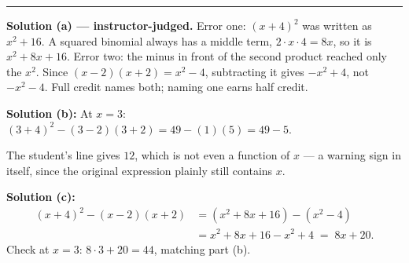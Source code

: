 \documentclass[12pt]{article}
\begin{document}
\vspace{0.15cm}\noindent\rule{\linewidth}{0.2pt}


\textbf{Solution (a) --- instructor-judged.} Error one: $(x + 4)^2$ was written as $x^2 + 16$. A
squared binomial always has a middle term, $2\cdot x\cdot 4 = 8x$, so it is $x^2 + 8x + 16$.
Error two: the minus in front of the second product reached only the $x^2$. Since
$(x-2)(x+2) = x^2 - 4$, subtracting it gives $-x^2 + 4$, not $-x^2 - 4$. Full credit names both;
naming one earns half credit.

\noindent\textbf{Solution (b):} \quad At $x = 3$:
$(3 + 4)^2 - (3 - 2)(3 + 2) = 49 - (1)(5) = 49 - 5$. 

\noindent The student's line gives $12$, which is not even a function of $x$ --- a warning sign in
itself, since the original expression plainly still contains $x$.

\noindent\textbf{Solution (c):}
\begin{align*}
  (x+4)^2 - (x-2)(x+2) &= (x^2 + 8x + 16) - (x^2 - 4)\\
                       &= x^2 + 8x + 16 - x^2 + 4 \;=\; 8x + 20.
\end{align*}
Check at $x = 3$: $8\cdot 3 + 20 = 44$, matching part (b). 
\end{document}
